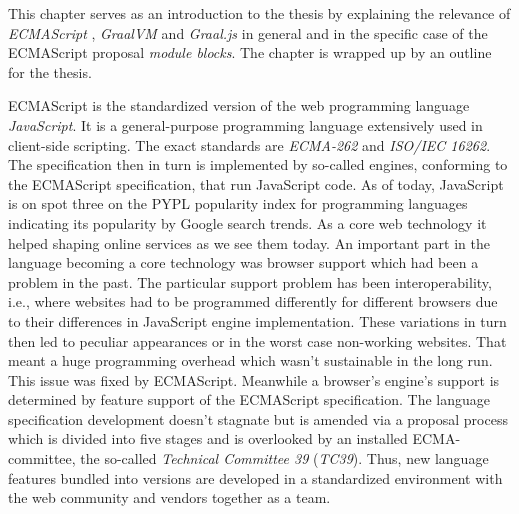 This chapter serves as an introduction to the thesis by explaining the relevance of \emph{ECMAScript} \cite{ecma}, \emph{GraalVM} \cite{graalVMIntro} and \emph{Graal.js} \cite{Graaljs} in general and in the specific case of the ECMAScript proposal \emph{module blocks}. The chapter is wrapped up by an outline for the thesis.

ECMAScript \cite{ecma} is the standardized version of the web programming language \emph{JavaScript}. It is a general-purpose programming language extensively used in client-side scripting. The exact standards are \emph{ECMA-262} and \emph{ISO/IEC 16262}\cite{ecma}. The specification then in turn is implemented by so-called engines, conforming to the ECMAScript specification, that run JavaScript code. As of today, JavaScript is on spot three on the PYPL popularity index for programming languages \cite{pypl} indicating its popularity by Google search trends. As a core web technology it helped shaping online services as we see them today. An important part in the language becoming a core technology was browser support which had been a problem in the past. The particular support problem has been interoperability, i.e., where websites had to be programmed differently for different browsers due to their differences in JavaScript engine implementation\cite{10.1145/3386327}. These variations in turn then led to peculiar appearances or in the worst case non-working websites. That meant a huge programming overhead which wasn't sustainable in the long run. This issue was fixed by ECMAScript. Meanwhile a browser's engine's support is determined by feature support of the ECMAScript specification. The language specification development doesn't stagnate but is amended via a proposal process which is divided into five stages and is overlooked by an installed ECMA-committee, the so-called \emph{Technical Committee 39} (\emph{TC39}). Thus, new language features bundled into versions are developed in a standardized environment with the web community and vendors together as a team. 

